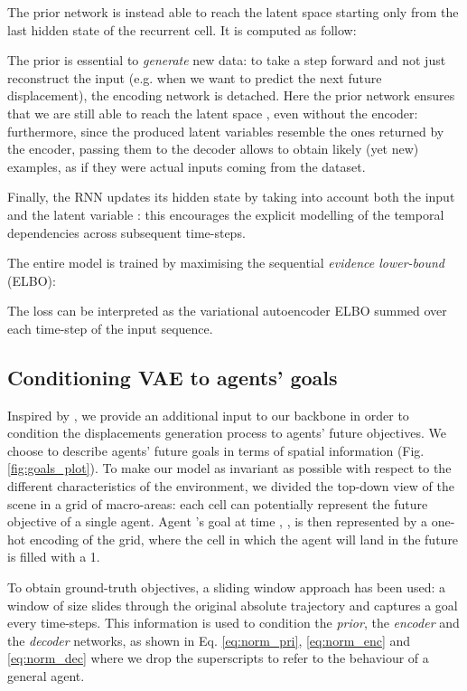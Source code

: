 \documentclass[10pt,a4paper,conference]{IEEEtran}
\begin{document}
The prior network is instead able to reach the latent space  starting only from the last hidden state  of the recurrent cell. It is computed as follow:


The prior is essential to \textit{generate} new data: to take a step forward and not just reconstruct the input (e.g. when we want to predict the next future displacement), the encoding network is detached. Here the prior network ensures that we are still able to reach the latent space , even without the encoder: furthermore, since the produced latent variables resemble the ones returned by the encoder, passing them to the decoder allows to obtain likely (yet new) examples, as if they were actual inputs coming from the dataset.

Finally, the RNN updates its hidden state by taking into account both the input  and the latent variable : this encourages the explicit modelling of the temporal dependencies across subsequent time-steps.


The entire model is trained by maximising the sequential \textit{evidence lower-bound} (ELBO):




\bigbreak
The loss can be interpreted as the variational autoencoder ELBO summed over each time-step  of the input sequence.


\subsection{Conditioning VAE to agents' goals}
Inspired by \cite{cvae,cvae2,weeksup,conditionalflow, where_will_they_go,Jiachen_IROS19}, we provide an additional input to our backbone in order to condition the displacements generation process to agents' future objectives.
We choose to describe agents' future goals in terms of spatial information (Fig. \ref{fig:goals_plot}). To make our model as invariant as possible with respect to the different characteristics of the environment, we divided the top-down view of the scene in a grid of macro-areas: each cell can potentially represent the future objective of a single agent. 
Agent 's goal at time , , is then represented by a one-hot encoding of the grid, where the cell in which the agent will land in the future is filled with a 1. 

To obtain ground-truth objectives, a sliding window approach has been used: a window of size  slides through the original absolute trajectory and captures a goal every  time-steps. This information is used to condition the \emph{prior}, the \emph{encoder} and the \emph{decoder} networks, as shown in Eq. \eqref{eq:norm_pri}, \eqref{eq:norm_enc} and \eqref{eq:norm_dec} where we drop the superscripts to refer to the behaviour of a general agent.
\end{document}
